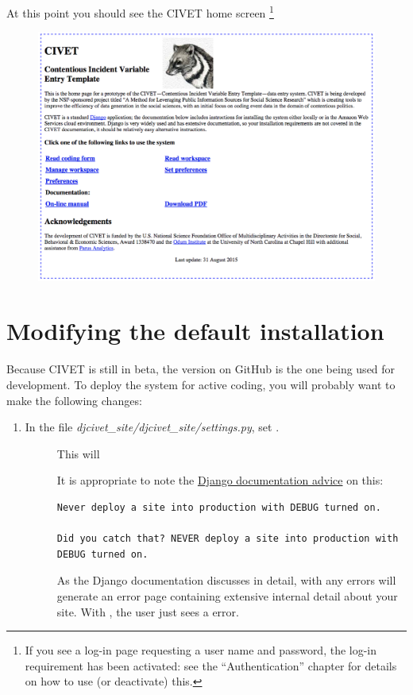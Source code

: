 \documentclass[letterpaper,10pt,english]{sphinxmanual}
\begin{document}
At this point you should see the CIVET home screen \footnote{
If you see a log-in page requesting a user name and password, the log-in requirement
has been activated: see the “Authentication” chapter for details on how to use
(or deactivate) this.
}
\begin{figure}[htbp]
\centering

\includegraphics[width=1.000\linewidth]{civethome.png}
\end{figure}


\section{Modifying the default installation}
\label{installing:modifying-the-default-installation}
Because CIVET is still in beta, the version on GitHub is the one being used for
development. To deploy the system for active coding, you will probably want
to make the following changes:
\begin{enumerate}
\item {} \begin{description}
\item[{In the file \emph{djcivet\_site/djcivet\_site/settings.py}, set .}] \leavevmode
This will

It is appropriate to note the \href{https://docs.djangoproject.com/en/1.8/ref/settings/}{Django documentation advice}
on this:

\begin{Verbatim}[commandchars=\\\{\}]
Never deploy a site into production with DEBUG turned on.

Did you catch that? NEVER deploy a site into production with DEBUG turned on.
\end{Verbatim}

As the Django documentation discusses in detail, with  any
errors will generate an error page containing extensive internal detail
about your site. With , the user just sees a 
error.

\end{description}

\end{enumerate}
\end{document}
